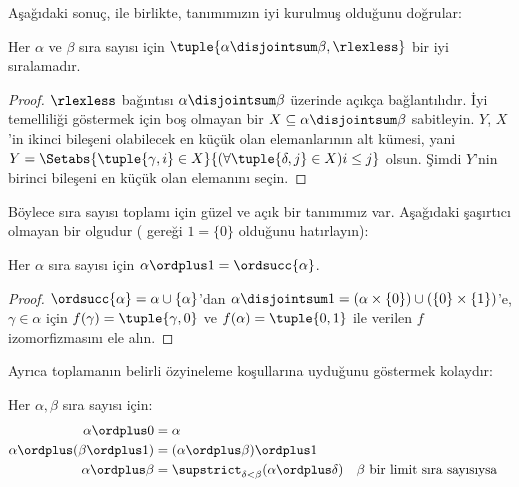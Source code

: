 Aşağıdaki sonuç,
 ile birlikte,
tanımımızın iyi kurulmuş olduğunu doğrular:

\begin{lem}
Her $\alpha$ ve $\beta$ sıra sayısı için
$\tuple{\alpha\disjointsum\beta,\rlexless}$ bir iyi sıralamadır.
\end{lem}

\begin{proof}
$\rlexless$ bağıntısı $\alpha\disjointsum\beta$ üzerinde açıkça
bağlantılıdır. İyi temelliliği göstermek için boş olmayan bir
$X\subseteq\alpha\disjointsum\beta$ sabitleyin. $Y$, $X$'in ikinci
bileşeni olabilecek en küçük olan elemanlarının alt kümesi, yani
$Y=\Setabs{\tuple{\gamma,i}\in X}{(\forall\tuple{\delta,j}\in X)i\leq j}$
olsun. Şimdi $Y$'nin birinci bileşeni en küçük olan elemanını seçin.
\end{proof}
\noindent
Böylece sıra sayısı toplamı için güzel ve açık bir tanımımız var. Aşağıdaki
şaşırtıcı olmayan bir olgudur
( gereği $1=\{0\}$ olduğunu hatırlayın):
\begin{prop}
Her $\alpha$ sıra sayısı için $\alpha\ordplus 1=\ordsucc{\alpha}$.
\end{prop}

\begin{proof}
$\ordsucc{\alpha}=\alpha\cup\{\alpha\}$'dan
$\alpha\disjointsum1=(\alpha\times\{0\})\cup(\{0\}\times\{1\})$'e,
$\gamma\in\alpha$ için $f(\gamma)=\tuple{\gamma,0}$ ve
$f(\alpha)=\tuple{0,1}$ ile verilen $f$ izomorfizmasını ele alın.
\end{proof}
\noindent
Ayrıca toplamanın belirli özyineleme koşullarına uyduğunu göstermek kolaydır:

\begin{lem}
Her $\alpha,\beta$ sıra sayısı için:
\begin{align*}
	\alpha\ordplus 0 &= \alpha\\
	\alpha \ordplus (\beta\ordplus 1) &= (\alpha\ordplus\beta)\ordplus 1\\
	\alpha\ordplus\beta &= \supstrict_{\delta < \beta}(\alpha\ordplus\delta) && \text{$\beta$ bir limit sıra sayısıysa}
\end{align*}
\end{lem}


